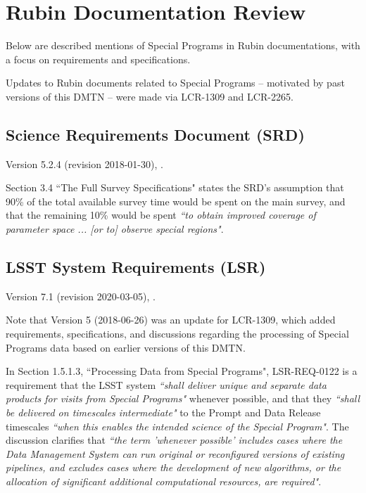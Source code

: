 \section{Rubin Documentation Review}\label{sec:docrev}

Below are described mentions of Special Programs in Rubin documentations, with a focus on requirements and specifications.

Updates to Rubin documents related to Special Programs -- motivated by past versions of this DMTN -- were made via LCR-1309 and LCR-2265. 



\subsection{Science Requirements Document (SRD)}

Version 5.2.4 (revision 2018-01-30), .

Section 3.4 ``The Full Survey Specifications" states the SRD's assumption that 90\% of the total available survey time would be spent on the main survey, and that the remaining 10\% would be spent {\it ``to obtain improved coverage of parameter space ... [or to] observe special regions"}.



\subsection{LSST System Requirements (LSR)}

Version 7.1 (revision 2020-03-05), .

Note that Version 5 (2018-06-26) was an update for LCR-1309, which added requirements, specifications, and discussions regarding the processing of Special Programs data based on earlier versions of this DMTN.

In Section 1.5.1.3, ``Processing Data from Special Programs", LSR-REQ-0122 is a requirement that the LSST system {\it ``shall deliver unique and separate data products for visits from Special Programs"} whenever possible, and that they {\it ``shall be delivered on timescales intermediate"} to the Prompt and Data Release timescales {\it ``when this enables the intended science of the Special Program"}.
The discussion clarifies that {\it ``the term 'whenever possible' includes cases where the Data Management System can run original or reconfigured versions of existing pipelines, and excludes cases where the development of new algorithms, or the allocation of significant additional computational resources, are required"}.

